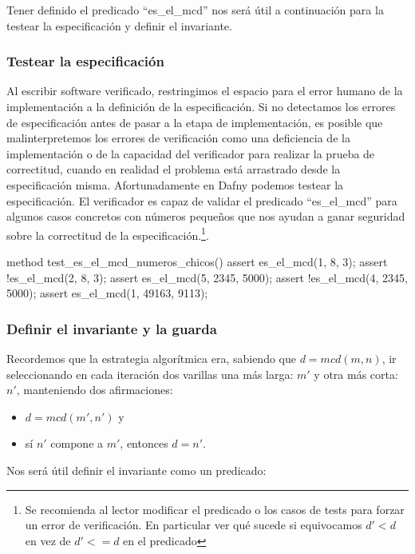 \documentclass[12pt, a4paper, openany, fleqn]{book}
\begin{document}
    Tener definido el predicado ``es\_el\_mcd'' nos será útil a continuación para la testear la especificación y definir el invariante.

    \subsubsection*{Testear la especificación}
    Al escribir software verificado, restringimos el espacio para el error humano de la implementación a la definición de la especificación.
    Si no detectamos los errores de especificación antes de pasar a la etapa de implementación, es posible que malinterpretemos los errores de verificación como una deficiencia de la implementación o de la capacidad del verificador para realizar la prueba de correctitud, cuando en realidad el problema está arrastrado desde la especificación misma.
    Afortunadamente en Dafny podemos testear la especificación.
    El verificador es capaz de validar el predicado ``es\_el\_mcd'' para algunos casos concretos con números pequeños que nos ayudan a ganar seguridad sobre la correctitud de la especificación.\footnote{Se recomienda al lector modificar el predicado o los casos de tests para forzar un error de verificación. En particular ver qué sucede si equivocamos $d' < d$ en vez de $d' <= d$ en el predicado}.

    \begin{dafny}
method test_es_el_mcd_numeros_chicos(){
    assert es_el_mcd(1, 8, 3);
    assert !es_el_mcd(2, 8, 3);
    assert es_el_mcd(5, 2345, 5000);
    assert !es_el_mcd(4, 2345, 5000);
    assert es_el_mcd(1, 49163, 9113);
}
    \end{dafny}

    \subsubsection*{Definir el invariante y la guarda}

    Recordemos que la estrategia algorítmica era, sabiendo que $d = mcd(m, n)$, ir seleccionando en cada iteración dos varillas una más larga: $m'$ y otra más corta: $n'$, manteniendo dos afirmaciones:
    \begin{itemize}
        \item $d = mcd(m', n')$ y
        \item sí $n'$ compone a $m'$, entonces $d = n'$.
    \end{itemize}

    Nos será útil definir el invariante como un predicado:
\end{document}
